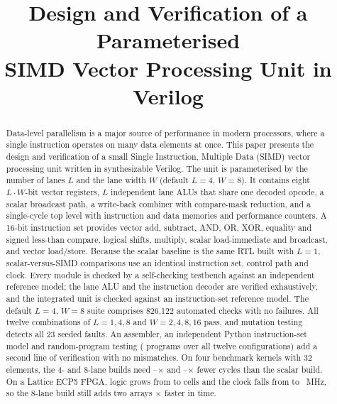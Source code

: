 \documentclass[conference]{IEEEtran}
\begin{document}
\title{Design and Verification of a Parameterised\\SIMD Vector Processing Unit in Verilog}

\author{
}

\maketitle

\begin{abstract}
Data-level parallelism is a major source of performance in modern processors,
where a single instruction operates on many data elements at once. This paper
presents the design and verification of a small Single Instruction, Multiple
Data (SIMD) vector processing unit written in synthesizable Verilog. The unit is
parameterised by the number of lanes $L$ and the lane width $W$ (default $L=4$,
$W=8$). It contains eight $L\cdot W$-bit vector registers, $L$ independent lane
ALUs that share one decoded opcode, a scalar broadcast path, a write-back
combiner with compare-mask reduction, and a single-cycle top level with
instruction and data memories and performance counters. A 16-bit instruction set
provides vector add, subtract, AND, OR, XOR, equality and signed less-than
compare, logical shifts, multiply, scalar load-immediate and broadcast, and
vector load/store. Because the scalar baseline is the same RTL built with $L=1$,
scalar-versus-SIMD comparisons use an identical instruction set, control path
and clock. Every module is checked by a self-checking testbench against an
independent reference model; the lane ALU and the instruction decoder are
verified exhaustively, and the integrated unit is checked against an
instruction-set reference model. The default $L=4$, $W=8$ suite comprises
826{,}122 automated checks with no failures. All twelve combinations of
$L=1,4,8$ and $W=2,4,8,16$ pass, and mutation testing detects all 23 seeded faults.
An assembler, an independent Python instruction-set model and random-program
testing (\RandPrograms{} programs over all twelve configurations) add a second
line of verification with no mismatches. On four benchmark kernels with 32
elements, the 4- and 8-lane builds need \SpeedupFourFour--\SpeedupThreeFour$\times$
and \SpeedupTwoEight--\SpeedupThreeEight$\times$ fewer cycles than the scalar build.
On a Lattice ECP5 FPGA, logic grows from \CombOne{} to \CombEight{} cells and
the clock falls from \FmaxOne{} to \FmaxEight{}~MHz, so the 8-lane build still
adds two arrays \EffOneEight$\times$ faster in time.
\end{abstract}
\end{document}
